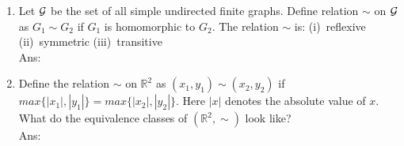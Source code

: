 \documentclass[10pt, letterpaper]{article}
\newcommand{\eat}[1]{}
\begin{document}
\begin{enumerate}


\item Let $\cal{G}$ be the set of all simple undirected finite graphs. Define relation $\sim$ on $\cal{G}$ as $G_1 \sim G_2$ if $G_1$ is homomorphic to $G_2$. The relation $\sim$ is: (i)~reflexive (ii)~symmetric (iii)~transitive\\
Ans:



\item Define the relation $\sim$ on $\mathbb{R}^2$ as $(x_1, y_1) \sim (x_2, y_2)$ if $max\{|x_1|, |y_1|\} = max\{|x_2|,  |y_2|\}$. Here $|x|$ denotes the absolute value of $x$. What do the equivalence classes of $(\mathbb{R}^2, \sim)$ look like?\\
Ans:



\end{enumerate}
\end{document}
